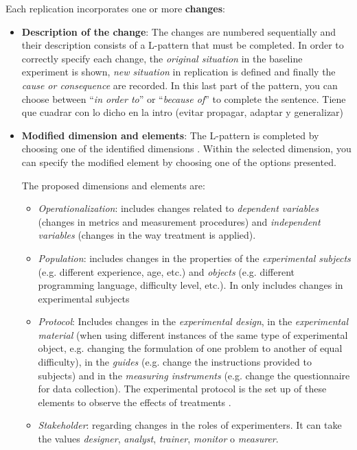 Each replication incorporates one or more \textbf{changes}:
\begin{itemize}
\item \textbf {Description of the change}: The changes are numbered sequentially and their description consists of a L-pattern that must be completed.  In order to correctly specify each change, the \textit{original situation} in the baseline experiment is shown, \textit{new situation} in replication is defined and finally the \textit{cause or consequence} are recorded.  In this last part of the pattern, you can choose between ``\textit{in order to}'' or ``\textit{because of}'' to complete the sentence.
\textcolor[rgb]{1,0,0}{Tiene que cuadrar con lo dicho en la intro (evitar propagar, adaptar y generalizar)}
\item \textbf {Modified dimension and elements}: The L-pattern is completed by choosing one of the identified dimensions \cite{gomez2014understanding,santos2018analyzing}. Within the selected dimension, you can specify the modified element by choosing one of the options presented. 

The proposed dimensions and elements are:
\begin{itemize}
\item \textit{Operationalization}: includes changes related to \emph{dependent variables} (changes in metrics and measurement procedures) and \emph{ independent variables} (changes in the way treatment is applied). 

\item \textit{Population}: includes changes in the properties of the \emph{experimental subjects} (e.g. different experience, age, etc.) and \emph{objects} (e.g. different programming language, difficulty level, etc.). \textcolor[rgb]{1,0,0}{In \cite{santos2018analyzing} only includes changes in experimental subjects}
\item \textit{Protocol}: Includes changes in the \emph{experimental design}, in the \emph{experimental material} (when using different instances of the same type of experimental object, e.g. changing the formulation of one problem to another of equal difficulty), in the \emph{guides} (e.g. change the instructions provided to subjects) and in the \emph{measuring instruments} (e.g. change the questionnaire for data collection). The experimental protocol is the set up of these elements to observe the effects of treatments \cite{Juristo2012}.
\item \textit{Stakeholder}: regarding changes in the roles of experimenters. It can take the values \emph{designer}, \emph{analyst}, \emph{trainer}, \emph{monitor} o \emph{measurer}.



\end{itemize}
\end{itemize}
